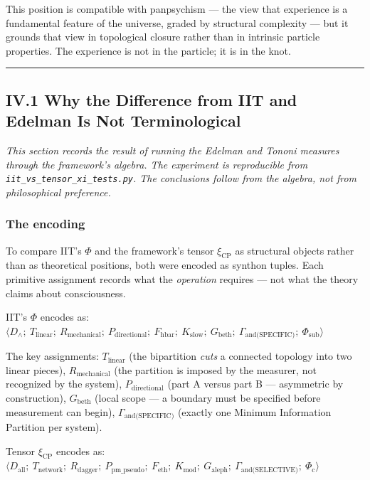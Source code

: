 \documentclass[12pt,a4paper]{article}
\begin{document}
This position is compatible with panpsychism --- the view that experience is a fundamental feature of the universe, graded by structural complexity --- but it grounds that view in topological closure rather than in intrinsic particle properties. The experience is not in the particle; it is in the knot.

\begin{center}
\rule{0.5\textwidth}{0.4pt}
\end{center}

\subsection{IV.1 Why the Difference from IIT and Edelman Is Not Terminological}

\emph{This section records the result of running the Edelman and Tononi measures through the framework's algebra. The experiment is reproducible from \texttt{iit\_vs\_tensor\_xi\_tests.py}. The conclusions follow from the algebra, not from philosophical preference.}

\subsubsection{The encoding}

To compare IIT's $\Phi$ and the framework's tensor $\xi_\text{CP}$ as structural objects rather than as theoretical positions, both were encoded as synthon tuples. Each primitive assignment records what the \emph{operation} requires --- not what the theory claims about consciousness.

IIT's $\Phi$ encodes as: $\langle D_\wedge;\ T_\text{linear};\ R_\text{mechanical};\ P_\text{directional};\ F_\text{hbar};\ K_\text{slow};\ G_\text{beth};\ \Gamma_\text{and(SPECIFIC)};\ \Phi_\text{sub} \rangle$

The key assignments: $T_\text{linear}$ (the bipartition \emph{cuts} a connected topology into two linear pieces), $R_\text{mechanical}$ (the partition is imposed by the measurer, not recognized by the system), $P_\text{directional}$ (part A versus part B --- asymmetric by construction), $G_\text{beth}$ (local scope --- a boundary must be specified before measurement can begin), $\Gamma_\text{and(SPECIFIC)}$ (exactly one Minimum Information Partition per system).

Tensor $\xi_\text{CP}$ encodes as: $\langle D_\text{all};\ T_\text{network};\ R_\text{dagger};\ P_\text{pm\_pseudo};\ F_\text{eth};\ K_\text{mod};\ G_\text{aleph};\ \Gamma_\text{and(SELECTIVE)};\ \Phi_\text{c} \rangle$
\end{document}
